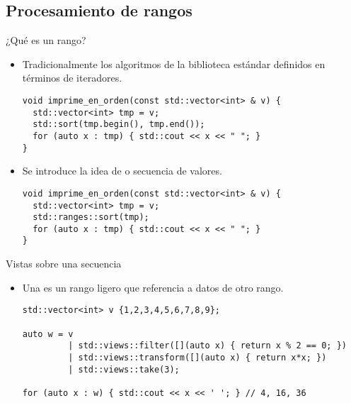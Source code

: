 \subsection{Procesamiento de rangos}

\begin{frame}[t,fragile]{¿Qué es un rango?}
\begin{itemize}
  \item Tradicionalmente los algoritmos de la biblioteca estándar
        definidos en términos de iteradores.
\begin{lstlisting}
void imprime_en_orden(const std::vector<int> & v) {
  std::vector<int> tmp = v;
  std::sort(tmp.begin(), tmp.end());
  for (auto x : tmp) { std::cout << x << " "; }
}
\end{lstlisting}

  \vfill\pause
  \item Se introduce la idea de  o secuencia de valores.
\begin{lstlisting}
void imprime_en_orden(const std::vector<int> & v) {
  std::vector<int> tmp = v;
  std::ranges::sort(tmp);
  for (auto x : tmp) { std::cout << x << " "; }
}
\end{lstlisting}
\end{itemize}
\end{frame}

\begin{frame}[t,fragile]{Vistas sobre una secuencia}
\begin{itemize}
  \item Una  es un rango ligero que referencia a datos
        de otro rango.
\begin{lstlisting}
std::vector<int> v {1,2,3,4,5,6,7,8,9};

auto w = v
         | std::views::filter([](auto x) { return x % 2 == 0; })
         | std::views::transform([](auto x) { return x*x; })
         | std::views::take(3);

for (auto x : w) { std::cout << x << ' '; } // 4, 16, 36
\end{lstlisting}
\end{itemize}
\end{frame}

